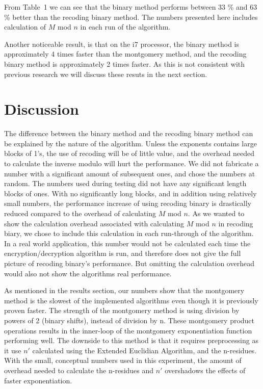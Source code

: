 \documentclass[twocolumn]{IEEEtran}
\begin{document}
From Table~1 we can see that the binary method performs between 33 \% and 63 \% better than the recoding binary method. The numbers presented here includes calculation of $M$ mod $n$ in each run of the algorithm.

Another noticeable result, is that on the i7 processor, the binary method is approximately 4 times faster than the montgomery method, and the recoding binary method is approximately 2 times faster. As this is not consistent with previous research we will discuss these resuts in the next section.

\section{Discussion}
The difference between the binary method and the recoding binary method can be explained by the nature of the algorithm. Unless the exponents contains large blocks of 1's, the use of recoding will be of little value, and the overhead needed to calculate the inverse modulo will hurt the performance. We did not fabricate a number with a significant amount of subsequent ones, and chose the numbers at random. The numbers used during testing did not have any significant length blocks of ones. With no significantly long blocks, and in addition using relatively small numbers, the performance increase of using recoding binary is drastically reduced compared to the overhead of calculating $M$ mod $n$. As we wanted to show the calculation overhead associated with calculating $M$ mod $n$ in recoding biary, we chose to include this calculation in each run-through of the algorithm. In a real world application, this number would not be calculated each time the encryption/decryption algorithm is run, and therefore does not give the full picture of recoding binary's performance. But omitting the calculation overhead would also not show the algorithms real performance.

As mentioned in the results section, our numbers show that the montgomery method is the slowest of the implemented algorithms even though it is previously proven faster. The strength of the montgomery method is using division by powers of 2 (binary shifts), instead of division by n. These montgomery product operations results in the inner-loop of the montgomery exponentiation function performing well. The downside to this method is that it requires preprocessing as it use $n'$ calculated using the Extended Euclidian Algorithm, and the n-residues. With the small, conceptual numbers used in this experiment, the amount of overhead needed to calculate the n-residues and $n'$ overshadows the effects of faster exponentiation. 
\end{document}
